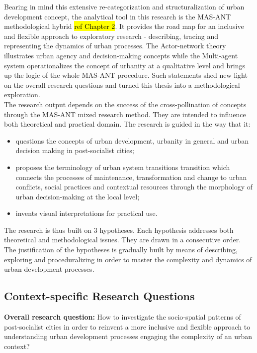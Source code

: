 \documentclass[11pt]{report}
\begin{document}
Bearing in mind this extensive re-categorization and structuralization of urban development concept, the analytical tool in this research is the MAS-ANT methodological hybrid \hl{ref Chapter 2}. 
It provides the road map for an inclusive and flexible approach to exploratory research - describing, tracing and representing the dynamics of urban processes.
The Actor-network theory illustrates urban agency and decision-making concepts while the Multi-agent system operationalizes the concept of urbanity at a qualitative level and brings up the logic of the whole MAS-ANT procedure. Such statements shed new light on the overall research questions and turned this thesis into a methodological exploration.
\\
The research output depends on the success of the cross-pollination of concepts through the MAS-ANT mixed research method. They are intended to influence both theoretical and practical domain. The research is guided in the way that it:
\begin{itemize}
\item questions the concepts of urban development, urbanity in general and urban decision making in post-socialist cities;
\item proposes the terminology of urban system transitions transition which connects the processes of maintenance, transformation and change to urban conflicts, social practices and contextual resources through the morphology of urban decision-making at the local level;
\item invents visual interpretations for practical use.
\end{itemize}

The research is thus built on 3 hypotheses. Each hypothesis addresses both theoretical and methodological issues. They are drawn in a consecutive order. The justification of the hypotheses is gradually built by means of describing, exploring and proceduralizing in order to master the complexity and dynamics of urban development processes. 

\subsection{Context-specific Research Questions}

\textbf{Overall research question:} How to investigate the socio-spatial patterns of post-socialist cities in order to reinvent a more inclusive and flexible approach to understanding urban development processes engaging the complexity of an urban context? 
\end{document}
